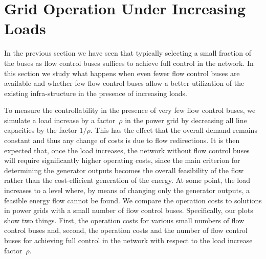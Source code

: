 \documentclass{article}[11pt,a4paper]
\begin{document}
\section{Grid Operation Under Increasing Loads}	
\label{sec:grid-control-when-approaching-capacity-limits}
In the previous section we have seen that typically selecting a small
fraction of the buses as flow control buses suffices to achieve full
control in the network.  In this section we study what happens when
even fewer flow control buses are available and whether few flow control buses
allow a better utilization of the existing infra-structure in the
presence of increasing loads.

To measure the controllability in the presence of very few flow
control buses, we simulate a load increase by a factor~$\rho$ in the
power grid by decreasing all line capacities by the factor $1/\rho$.
This has the effect that the overall demand remains constant and thus
any change of costs is due to flow redirections.  It is then expected
that, once the load increases, the network without flow control buses
will require significantly higher operating costs, since the main
criterion for determining the generator outputs becomes the overall
feasibility of the flow rather than the cost-efficient generation of
the energy.  At some point, the load increases to a level where, by
means of changing only the generator outputs, a feasible energy flow
cannot be found.  We compare the operation costs to solutions in power
grids with a small number of flow control buses.  Specifically, our
plots show two things.  First, the operation costs for various small
numbers of flow control buses and, second, the operation costs and the
number of flow control buses for achieving full control in the network
with respect to the load increase factor~$\rho$.
\end{document}
